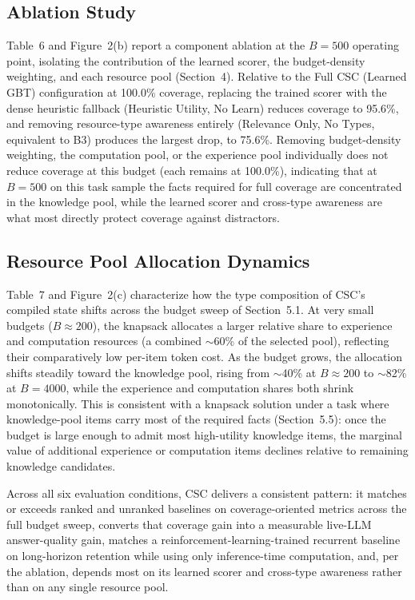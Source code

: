 \documentclass{article}
\begin{document}
\subsection{Ablation Study}

Table~6 and Figure~2(b) report a component ablation at the $B=500$ operating point, isolating the contribution of the learned scorer, the budget-density weighting, and each resource pool (Section~4). Relative to the Full CSC (Learned GBT) configuration at 100.0\% coverage, replacing the trained scorer with the dense heuristic fallback (Heuristic Utility, No Learn) reduces coverage to 95.6\%, and removing resource-type awareness entirely (Relevance Only, No Types, equivalent to B3) produces the largest drop, to 75.6\%. Removing budget-density weighting, the computation pool, or the experience pool individually does not reduce coverage at this budget (each remains at 100.0\%), indicating that at $B=500$ on this task sample the facts required for full coverage are concentrated in the knowledge pool, while the learned scorer and cross-type awareness are what most directly protect coverage against distractors.

\subsection{Resource Pool Allocation Dynamics}

Table~7 and Figure~2(c) characterize how the type composition of CSC's compiled state shifts across the budget sweep of Section~5.1. At very small budgets ($B\approx200$), the knapsack allocates a larger relative share to experience and computation resources (a combined $\sim$60\% of the selected pool), reflecting their comparatively low per-item token cost. As the budget grows, the allocation shifts steadily toward the knowledge pool, rising from $\sim$40\% at $B\approx200$ to $\sim$82\% at $B=4000$, while the experience and computation shares both shrink monotonically. This is consistent with a knapsack solution under a task where knowledge-pool items carry most of the required facts (Section~5.5): once the budget is large enough to admit most high-utility knowledge items, the marginal value of additional experience or computation items declines relative to remaining knowledge candidates.

Across all six evaluation conditions, CSC delivers a consistent pattern: it matches or exceeds ranked and unranked baselines on coverage-oriented metrics across the full budget sweep, converts that coverage gain into a measurable live-LLM answer-quality gain, matches a reinforcement-learning-trained recurrent baseline on long-horizon retention while using only inference-time computation, and, per the ablation, depends most on its learned scorer and cross-type awareness rather than on any single resource pool.
\end{document}
